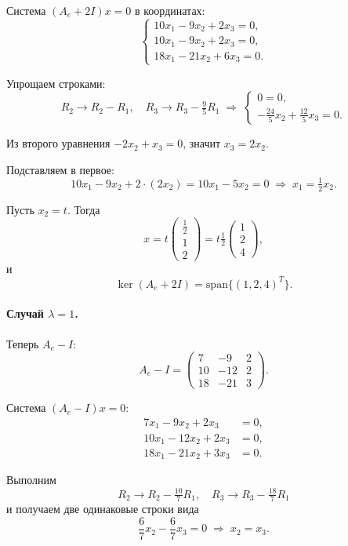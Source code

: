 \documentclass[12pt]{article}
\begin{document}
Система \((A_e+2I)x=0\) в координатах:
\[
	\begin{cases}
		10x_1 - 9x_2 + 2x_3 = 0, \\
		10x_1 - 9x_2 + 2x_3 = 0, \\
		18x_1 -21x_2 + 6x_3 = 0.
	\end{cases}
\]

Упрощаем строками:
\[
	R_2 \to R_2 - R_1,\quad
	R_3 \to R_3 - \tfrac{9}{5}R_1
	\;\Longrightarrow\;
	\begin{cases}
		0 = 0, \\
		-\tfrac{24}{5}x_2 + \tfrac{12}{5}x_3 = 0.
	\end{cases}
\]

Из второго уравнения \(-2x_2 + x_3 = 0\), значит \(x_3 = 2x_2\).

Подставляем в первое:
\[
	10x_1 -9x_2 +2\cdot(2x_2)=10x_1 -5x_2=0
	\;\Longrightarrow\;
	x_1 = \tfrac12 x_2.
\]

Пусть \(x_2=t\). Тогда
\[
	x = t\begin{pmatrix}\tfrac12\\1\\2\end{pmatrix}
	= t\tfrac12\begin{pmatrix}1\\2\\4\end{pmatrix},
\]
и
\[
	\ker(A_e+2I)=\mathrm{span}\{(1,2,4)^T\}.
\]

\paragraph*{Случай \(\lambda=1\).}
Теперь \(A_e - I\):
\[
	A_e - I=
	\begin{pmatrix}
		7  & -9  & 2 \\
		10 & -12 & 2 \\
		18 & -21 & 3
	\end{pmatrix}.
\]

Система \((A_e - I)x=0\):
\[
	\begin{aligned}
		7x_1 - 9x_2 + 2x_3  & = 0, \\
		10x_1 -12x_2 + 2x_3 & = 0, \\
		18x_1 -21x_2 + 3x_3 & = 0.
	\end{aligned}
\]

Выполним
\[
	R_2 \to R_2 - \tfrac{10}{7}R_1,\quad
	R_3 \to R_3 - \tfrac{18}{7}R_1
\]
и получаем две одинаковые строки вида
\[
	\frac{6}{7}x_2 - \frac{6}{7}x_3 = 0
	\;\Longrightarrow\;
	x_2 = x_3.
\]
\end{document}
